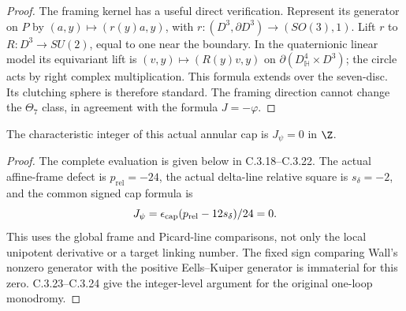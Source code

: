 \begin{proof}
The framing kernel has a useful direct verification. Represent
its generator on $P$ by
$(a,y)\mapsto(r(y)a,y)$, with
$r:(D^3,\partial D^3)\to(SO(3),1)$. Lift $r$ to
$R:D^3\to SU(2)$, equal to one near the boundary. In the
quaternionic linear model its equivariant lift is
$(v,y)\mapsto(R(y)v,y)$ on
$\partial(D^4_{\mathbb H}\times D^3)$; the circle acts by
right complex multiplication. This formula extends over the
seven-disc. Its clutching sphere is therefore standard.
The framing direction cannot change the $\Theta_7$ class,
in agreement with the formula $J=-\varphi$.
\end{proof}

\begin{corollary}
The characteristic integer of this actual annular cap is
$J_\psi=0$ in $\Z$.
\end{corollary}
\begin{proof}
The complete evaluation is given below in C.3.18--C.3.22.
The actual affine-frame defect is $p_{\mathrm{rel}}=-24$,
the actual delta-line relative square is $s_\delta=-2$, and
the common signed cap formula is
\[
 J_\psi=\epsilon_{\rm cap}
              (p_{\mathrm{rel}}-12s_\delta)/24=0.
\]
This uses the global frame and Picard-line comparisons, not
only the local unipotent derivative or a target linking number.
The fixed sign comparing Wall's nonzero generator with the
positive Eells--Kuiper generator is immaterial for this zero.
C.3.23--C.3.24 give the integer-level argument for the original
one-loop monodromy.
\end{proof}
